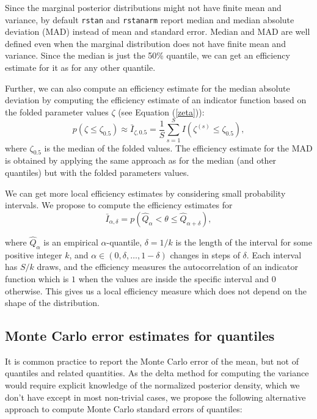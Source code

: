 \documentclass[american,]{article}
\theoremstyle{definition}
\begin{document}
Since the marginal posterior distributions might not have finite mean
and variance, by default \texttt{rstan} \citep{RStan.2.17} and \texttt{rstanarm}
\citep{RStanARM.2.17} report median and median absolute deviation (MAD)
instead of mean and standard error. Median and MAD are well defined
even when the marginal distribution does not have finite mean and
variance. Since the median is just the 50\% quantile, we can get an
efficiency estimate for it as for any other quantile.

Further, we can also compute an efficiency estimate for the median
absolute deviation by computing the efficiency estimate of an
indicator function based on the folded parameter values \(\zeta\) (see
Equation (\ref{zeta})):
\begin{equation}
p(\zeta \leq \zeta_{0.5}) \approx \bar{I}_{\zeta,0.5} = \frac{1}{S}\sum_{s=1}^S
I(\zeta^{(s)} \leq \zeta_{0.5}),
\end{equation}
where \(\zeta_{0.5}\) is the median of the folded values. The efficiency estimate for the MAD is obtained by applying the same
approach as for the median (and other quantiles) but with the folded
parameters values.


We can get more local efficiency estimates by considering small
probability intervals. We propose to compute the efficiency estimates
for
\begin{equation}
\bar{I}_{\alpha,\delta} = p(\hat{Q}_\alpha < \theta \leq \hat{Q}_{\alpha+\delta}),
\end{equation}

where \(\hat{Q}_\alpha\) is an empirical \(\alpha\)-quantile,
\(\delta=1/k\) is the length of the interval for some positive integer
\(k\), and \(\alpha \in (0,\delta,\ldots,1-\delta)\) changes in steps of
\(\delta\). Each interval has \(S/k\) draws, and the efficiency measures
the autocorrelation of an indicator function which is \(1\) when the
values are inside the specific interval and \(0\) otherwise. This gives
us a local efficiency measure which does not depend on the shape of the
distribution.

\hypertarget{mcse}{%
\subsection{Monte Carlo error estimates for quantiles}\label{mcse}}

It is common practice to report the Monte Carlo error of the mean,
but not of quantiles and related quantities. As the delta method for
computing the variance would require explicit knowledge of the
normalized posterior density, which we don't have except in most non-trivial
cases, we propose the following alternative approach to compute Monte
Carlo standard errors of quantiles:
\end{document}
